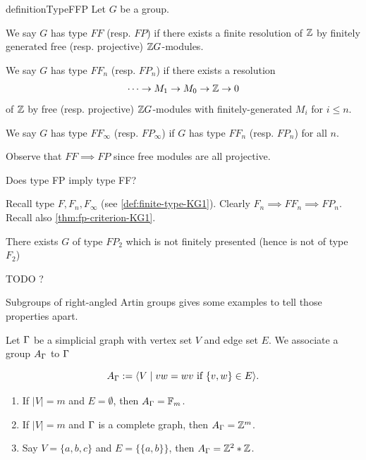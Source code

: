 \begin{restatable}{definition}{TypeFFP}
    \label{def:type-FF-FP}
    Let \(G\) be a group.

    We say \(G\) has type \(FF\) (resp. \(FP\)) if there exists a finite resolution of \(\mathbb{Z}\) by finitely generated free (resp. projective) \(\mathbb{Z} G\)-modules.

    We say \(G\) has type \(FF_n\) (resp. \(FP_n\)) if there exists a resolution 
    \[ \cdots\to M_1 \to M_0 \to \mathbb{Z} \to 0\]
    of \(\mathbb{Z}\) by free (resp. projective) \(\mathbb{Z} G\)-modules with finitely-generated \(M_i\) for \(i\leq n\).

    We say \(G\) has type \(FF_\infty\) (resp. \(FP_\infty\)) if \(G\) has type \(FF_n\) (resp. \(FP_n\)) for all \(n\).
\end{restatable}

Observe that \(FF\implies FP\) since free modules are all projective.

\begin{question}
    \label{q:FP-implies-FF}
    Does type FP imply type FF?
\end{question}

Recall type \(F, F_n, F_\infty\) (see \cref{def:finite-type-KG1}). Clearly \(F_n \implies FF_n \implies FP_n\). Recall also \cref{thm:fp-criterion-KG1}.

\begin{theorem}
    \label{thm:FP2-not-F2}
    There exists \(G\) of type \(FP_2\) which is not finitely presented (hence is not of type \(F_2\))
\end{theorem}
TODO ?

Subgroups of right-angled Artin groups gives some examples to tell those properties apart.


\begin{definition}
    \label{def:RAAG}
    Let \(\Gamma\) be a simplicial graph with vertex set \(V\) and edge set \(E\). We associate a group \(A_\Gamma\) to \(\Gamma\) 

    \[
        A_\Gamma := \langle V \mid vw=wv \text{ if } \{v,w\} \in E \rangle .
    \]
\end{definition}

\begin{example}
    \label{ex:RAAG}
    \begin{enumerate}
        \item If \(|V| =m\) and \(E=\emptyset\), then \(A_\Gamma = \mathbb{F}_m\).
        \item If \(|V|=m\) and \(\Gamma\) is a complete graph, then \(A_\Gamma = \mathbb{Z}^m\).
        \item Say \(V=\{a,b,c\}\) and \(E=\{\{a,b\}\}\), then \(A_\Gamma = \mathbb{Z}^2*\mathbb{Z}\).
    \end{enumerate}
\end{example}

